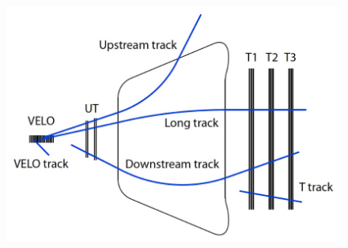 \documentclass[aspectratio=1610, 12pt, xcolor=dvipsnames]{beamer}
\begin{document}
\begin{frame}
\begin{columns}
\begin{column}{0.48\textwidth}
\begin{figure}
        \includegraphics[width=\textwidth]{track.png}
      \end{figure}
    \end{column}
  \end{columns}
\end{frame}
\end{document}
